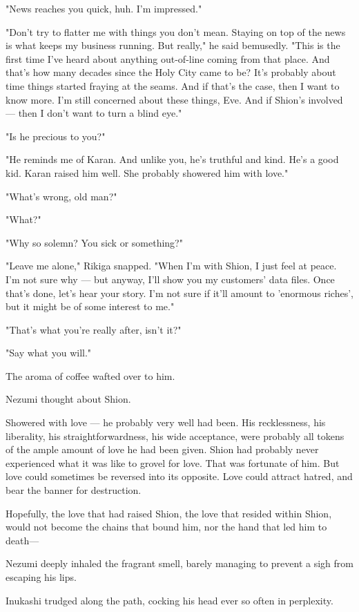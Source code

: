 "News reaches you quick, huh. I'm impressed."

"Don't try to flatter me with things you don't mean. Staying on top of
the news is what keeps my business running. But really," he said
bemusedly. "This is the first time I've heard about anything out-of-line
coming from that place. And that's how many decades since the Holy City
came to be? It's probably about time things started fraying at the
seams. And if that's the case, then I want to know more. I'm still
concerned about these things, Eve. And if Shion's involved --- then I
don't want to turn a blind eye."

"Is he precious to you?"

"He reminds me of Karan. And unlike you, he's truthful and kind. He's a
good kid. Karan raised him well. She probably showered him with love."

"What's wrong, old man?"

"What?"

"Why so solemn? You sick or something?"

"Leave me alone," Rikiga snapped. "When I'm with Shion, I just feel at
peace. I'm not sure why --- but anyway, I'll show you my customers' data
files. Once that's done, let's hear your story. I'm not sure if it'll
amount to 'enormous riches', but it might be of some interest to me."

"That's what you're really after, isn't it?"

"Say what you will."

The aroma of coffee wafted over to him.

Nezumi thought about Shion.

Showered with love --- he probably very well had been. His recklessness,
his liberality, his straightforwardness, his wide acceptance, were
probably all tokens of the ample amount of love he had been given. Shion
had probably never experienced what it was like to grovel for love. That
was fortunate of him. But love could sometimes be reversed into its
opposite. Love could attract hatred, and bear the banner for
destruction.

Hopefully, the love that had raised Shion, the love that resided within
Shion, would not become the chains that bound him, nor the hand that led
him to death---

Nezumi deeply inhaled the fragrant smell, barely managing to prevent a
sigh from escaping his lips.

Inukashi trudged along the path, cocking his head ever so often in
perplexity.

